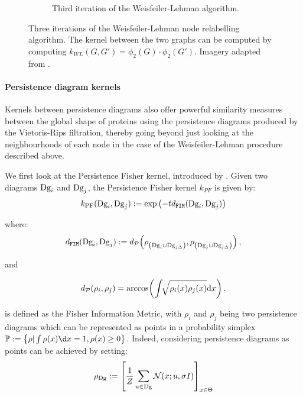 \begin{figure}
\begin{subfigure}[b]{0.5\textwidth}
    \captionsetup{width=1.4\linewidth}
    \caption{Third iteration of the Weisfeiler-Lehman algorithm.}
  \end{subfigure}
  \caption[Three iterations of the Weisfeiler-Lehman algorithm.]{Three iterations of the Weisfeiler-Lehman node relabelling algorithm.
    The kernel between the two graphs can be computed by computing
    $k_{WL}(G,G')=\phi_2(G)\cdot\phi_2(G')$. Imagery adapted from \cite{mengin2019}.}
  \label{fig:wl_algo}
\end{figure}

\paragraph{Persistence diagram kernels} Kernels between persistence diagrams
also offer powerful similarity measures between the global shape of proteins using the
persistence diagrams produced by the Vietoris-Rips filtration, thereby going
beyond just looking at the neighbourhoods of each node in the case of the
Weisfeiler-Lehman procedure described above.

We first look at the Persistence Fisher kernel, introduced by
\cite{le2018persistence}. Given two diagrams $\textnormal{Dg}_i$ and $\textnormal{Dg}_j$, the Persistence
Fisher kernel $k_{PF}$ is given by:
\begin{equation}
  \label{eq:kpf}
  k_{\text{PF}}(\textnormal{Dg}_i, \textnormal{Dg}_j ) :=\exp\left(-td_{\texttt{FIM}}(\textnormal{Dg}_i,\textnormal{Dg}_j)\right)
\end{equation}

where:
\begin{equation}
  \label{eq:dfim}
  d_{\texttt{FIM}}(\textnormal{Dg}_i, \textnormal{Dg}_j) := d_{\mathcal{P}} \! \left(\rho_{\left(\textnormal{Dg}_i \cup \text{Dg}_{j\Delta}\right)}, \rho_{\left(\textnormal{Dg}_j \cup \text{Dg}_{j\Delta}\right)} \right),
\end{equation}

and

\begin{equation}\label{equ:dFIM}
  d_{\mathcal{P}}(\rho_i, \rho_j) = \arccos \! \left(\int \!\!\sqrt{\rho_i(x) \rho_j(x)} \mathrm{d}x \right).
\end{equation}

is defined as the Fisher Information Metric, with $\rho_i$ and  $\rho_j$ being
two persistence diagrams which can be represented as points in a probability
simplex $\bbp := \left\{ \rho|\int\rho(x)\d x=1,\rho(x)\geq 0\right\}$. Indeed,
considering persistence diagrams as points can be achieved by setting:
\begin{equation}
  \label{eq:pdsaspoints}
  \rho_{\textnormal{Dg}} := \left[ {1\over Z} \sum_{u\in\textnormal{Dg}}\mathcal{N}(x;u,\sigma I)\right]_{x\in\Theta}
\end{equation}


